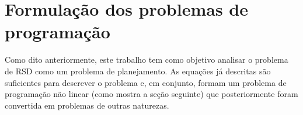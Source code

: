 \section{Formulação dos problemas de programação}

Como dito anteriormente, este trabalho tem como objetivo analisar o problema de RSD como um problema de planejamento.
As equações já descritas são suficientes para descrever o problema e, em conjunto, formam um problema de programação não linear (como mostra a seção seguinte) que posteriormente foram convertida em problemas de outras naturezas.